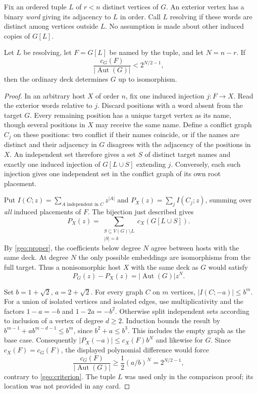 Fix an ordered tuple $L$ of $r<n$ distinct vertices of $G$. An exterior
vertex has a binary \emph{word} giving its adjacency to $L$ in order.
Call $L$ resolving if these words are distinct among vertices outside
$L$. No assumption is made about other induced copies of $G[L]$.

\begin{lemma}\label{geo:landmarks}
Let $L$ be resolving, let $F=G[L]$ be named by the tuple, and let
$N=n-r$. If
\begin{equation}
 \frac{c_G(F)}{|\operatorname{Aut}(G)|}<2^{N/2-1},
 \label{geo:criterion}
\end{equation}
then the ordinary deck determines $G$ up to isomorphism.
\end{lemma}

\begin{proof}
In an arbitrary host $X$ of order $n$, fix one induced injection
$j:F\to X$. Read the exterior words relative to $j$. Discard positions
with a word absent from the target $G$. Every remaining position has a
unique target vertex as its name, though several positions in $X$ may
receive the same name. Define a conflict graph $C_j$ on these positions:
two conflict if their names coincide, or if the names are distinct and
their adjacency in $G$ disagrees with the adjacency of the positions
in $X$. An independent set therefore gives a set $S$ of distinct target
names and exactly one induced injection of $G[L\cup S]$ extending $j$.
Conversely, each such injection gives one independent set in the
conflict graph of its own root placement.

Put $I(C;z)=\sum_{A\text{ independent in }C}z^{|A|}$ and
$P_X(z)=\sum_j I(C_j;z)$, summing over \emph{all} induced placements
of $F$. The bijection just described gives
\begin{equation}
 [z^k]P_X(z)=
 \sum_{\substack{S\subseteq V(G)\setminus L\\|S|=k}}c_X(G[L\cup S]).
 \label{geo:coeff}
\end{equation}
By \eqref{geo:proper}, the coefficients below degree $N$ agree between
hosts with the same deck. At degree $N$ the only possible embeddings are
isomorphisms from the full target. Thus a nonisomorphic host $X$ with
the same deck as $G$ would satisfy
\[
 P_G(z)-P_X(z)=|\operatorname{Aut}(G)|z^N.
\]

Set $b=1+\sqrt2$, $a=2+\sqrt2$. For every graph $C$ on $m$ vertices,
$|I(C;-a)|\le b^m$. For a union of isolated vertices and isolated edges,
use multiplicativity and the factors $1-a=-b$ and $1-2a=-b^2$. Otherwise
split independent sets according to inclusion of a vertex of degree
$d\ge2$. Induction bounds the result by $b^{m-1}+a b^{m-d-1}\le b^m$,
since $b^2+a\le b^3$. This includes the empty graph as the base case.
Consequently $|P_X(-a)|\le c_X(F)b^N$ and likewise for $G$. Since
$c_X(F)=c_G(F)$, the displayed polynomial difference would force
\[
 \frac{c_G(F)}{|\operatorname{Aut}(G)|}
 \ge \frac12(a/b)^N=2^{N/2-1},
\]
contrary to \eqref{geo:criterion}. The tuple $L$ was used only in the
comparison proof; its location was not provided in any card.
\end{proof}

